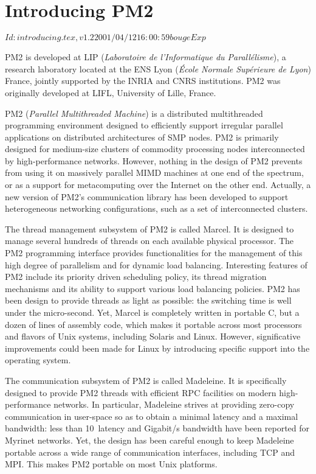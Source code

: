 \chapter{Introducing PM2}

\stamp $Id: introducing.tex,v 1.2 2001/04/12 16:00:59 bouge Exp $

PM2 is developed at LIP (\emph{Laboratoire de l'Informatique du
  Parall\'elisme}), a research laboratory located at the ENS Lyon
(\emph{\'Ecole Normale Sup\'erieure de Lyon}) France, jointly
supported by the INRIA and CNRS institutions. PM2 was originally
developed at LIFL, University of Lille, France.
  
PM2 (\emph{Parallel Multithreaded Machine}) is a distributed
multithreaded programming environment designed to efficiently support
irregular parallel applications on distributed architectures of SMP
nodes. PM2 is primarily designed for medium-size clusters of commodity
processing nodes interconnected by high-performance networks. However,
nothing in the design of PM2 prevents from using it on massively
parallel MIMD machines at one end of the spectrum, or as a support for
metacomputing over the Internet on the other end. Actually, a new
version of PM2's communication library has been developed to support
heterogeneous networking configurations, such as a set of
interconnected clusters.

The thread management subsystem of PM2 is called Marcel. It is
designed to manage several hundreds of threads on each available
physical processor. The PM2 programming interface provides
functionalities for the management of this high degree of parallelism
and for dynamic load balancing. Interesting features of PM2 include
its priority driven scheduling policy, its thread migration mechanisms
and its ability to support various load balancing policies. PM2 has
been design to provide threads as light as possible: the switching
time is well under the micro-second. Yet, Marcel is completely written
in portable C, but a dozen of lines of assembly code, which makes it
portable across most processors and flavors of Unix systems, including
Solaris and Linux. However, significative improvements could been made
for Linux by introducing specific support into the operating system.

The communication subsystem of PM2 is called Madeleine. It is
specifically designed to provide PM2 threads with efficient RPC
facilities on modern high-performance networks. In particular,
Madeleine strives at providing zero-copy communication in user-space
so as to obtain a minimal latency and a maximal bandwidth: less than
10~\us latency and Gigabit/s bandwidth have been reported for
Myrinet networks.  Yet, the design has been careful enough to keep
Madeleine portable across a wide range of communication interfaces,
including TCP and MPI. This makes PM2 portable on most Unix
platforms.

